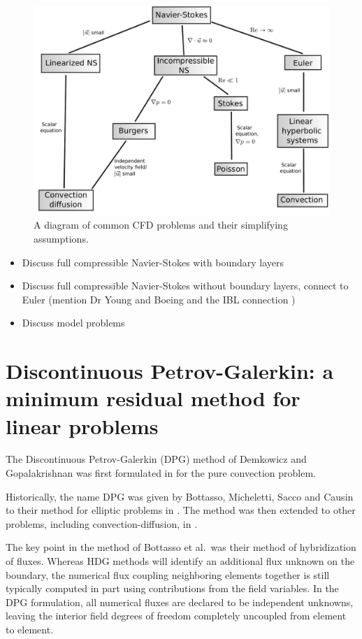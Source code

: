 \documentclass{report}
\begin{document}
\begin{figure}[!h]
\centering
\includegraphics[scale=.45]{figs/CFD_tree.pdf}
\caption{A diagram of common CFD problems and their simplifying assumptions.}
\end{figure}

\begin{itemize}
\item Discuss full compressible Navier-Stokes with boundary layers
\item Discuss full compressible Navier-Stokes without boundary layers, connect to Euler (mention Dr Young and Boeing and the IBL connection \cite{BoeingDrela})
\item Discuss model problems
\end{itemize}

\chapter{Discontinuous Petrov-Galerkin: a minimum residual method for linear problems}

The Discontinuous Petrov-Galerkin (DPG) method of Demkowicz and Gopalakrishnan was first formulated in \cite{DPG1} for the pure convection problem. 

Historically, the name DPG was given by Bottasso, Micheletti, Sacco and Causin to their method for elliptic problems in \cite{BottassoMichelettiSacco02}. The method was then extended to other problems, including convection-diffusion, in \cite{BottassoMichelettiSacco05,CausinSacco05,CausinSaccoBottasso05}. 

The key point in the method of Bottasso et al.\ was their method of hybridization of fluxes. Whereas HDG methods will identify an additional flux unknown on the boundary, the numerical flux coupling neighboring elements together is still typically computed in part using contributions from the field variables. In the DPG formulation, all numerical fluxes are declared to be independent unknowns, leaving the interior field degrees of freedom completely uncoupled from element to element. 
\end{document}
